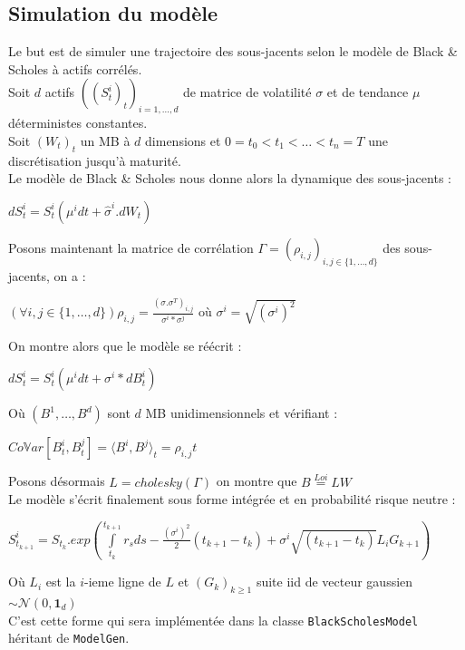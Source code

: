 \documentclass[a4paper,12pt]{article}
\begin{document}
\subsection{Simulation du modèle}
Le but est de simuler une trajectoire des sous-jacents selon le modèle de Black \& Scholes à actifs corrélés. \\[2mm]
Soit $d$ actifs $((S^i_t)_t)_{i=1,\ldots,d}$ de matrice de volatilité $\sigma$ et de tendance $\mu$ déterministes constantes. \\
Soit $(W_t)_t$ un MB à $d$ dimensions et $0=t_0<t_1<\ldots<t_n=T$ une discrétisation jusqu'à maturité. \\
Le modèle de Black \& Scholes nous donne alors la dynamique des sous-jacents : 
\begin{center}
$dS^i_t=S^i_t\left(\mu^idt+\widehat{\sigma}^i.dW_t\right)$
\end{center} 
Posons maintenant la matrice de corrélation $\Gamma=\left(\rho_{i,j}\right)_{i,j\in\{1,\ldots,d\}}$ des sous-jacents, on a :
\begin{center}
$\left(\forall i,j \in \{1,\ldots,d\}\right) \rho_{i,j}=\frac{\left(\sigma.\sigma^T\right)_{i,j}}{\sigma^i*\sigma^j}$  où $\sigma^i = \sqrt{(\sigma^i)^2}$
\end{center}
On montre alors que le modèle se réécrit : 
\begin{center}
$dS^i_t=S^i_t\left(\mu^idt + \sigma^i * dB^i_t\right)$
\end{center}
Où $\left(B^1,\ldots,B^d\right)$ sont $d$ MB unidimensionnels et vérifiant : 
\begin{center}
$Co\mathbb{V}ar\left[B^i_t,B^j_t\right]=\langle B^i,B^j\rangle_t=\rho_{i,j}t$
\end{center}
Posons désormais $L=cholesky(\Gamma)$ on montre que $B\overset{Loi}{=}LW$ \\
Le modèle s'écrit finalement sous forme intégrée et en probabilité risque neutre : 
\begin{center}
$S^i_{t_{k+1}}=S_{t_k}.exp\left(\int\limits_{t_k}^{t_{k+1}}r_sds-\frac{(\sigma^i)^2}{2}\left(t_{k+1}-t_{k}\right)+\sigma^i\sqrt{\left(t_{k+1}-t_{k}\right)}L_iG_{k+1}\right)$
\end{center}
Où $L_i$ est la $i$-ieme ligne de $L$ et $\left(G_k\right)_{k\geq 1}$ suite iid de vecteur gaussien $\sim\mathcal{N}(0,\mathbf{1}_d)$ \\[2mm]
C'est cette forme qui sera implémentée dans la classe {\tt BlackScholesModel} héritant de {\tt ModelGen}.
\end{document}
